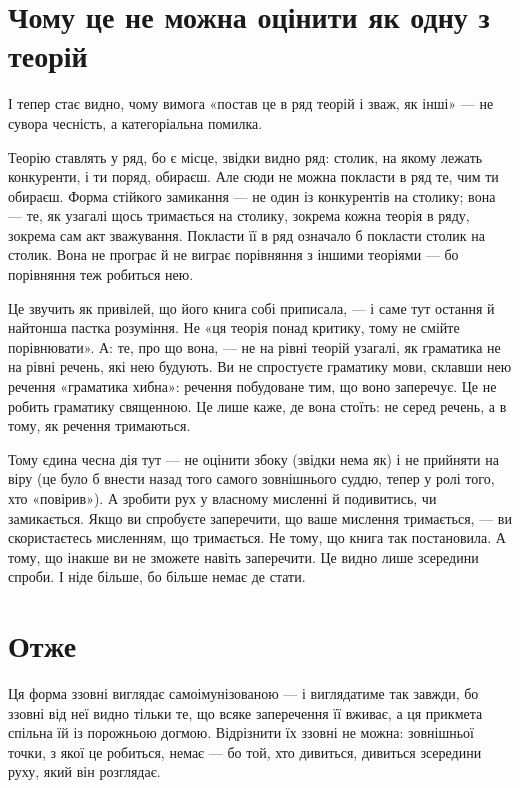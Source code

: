 \documentclass[12pt, a4paper, openany]{book}
\begin{document}
\section{Чому це не можна оцінити як одну з теорій}

І тепер стає видно, чому вимога «постав це в ряд теорій і зваж, як інші» --- не сувора чесність, а категоріальна помилка.

Теорію ставлять у ряд, бо є місце, звідки видно ряд: столик, на якому лежать конкуренти, і ти поряд, обираєш. Але сюди не можна покласти в ряд те, чим ти обираєш. Форма стійкого замикання --- не один із конкурентів на столику; вона --- те, як узагалі щось тримається на столику, зокрема кожна теорія в ряду, зокрема сам акт зважування. Покласти її в ряд означало б покласти столик на столик. Вона не програє й не виграє порівняння з іншими теоріями --- бо порівняння теж робиться нею.

Це звучить як привілей, що його книга собі приписала, --- і саме тут остання й найтонша пастка розуміння. Не «ця теорія понад критику, тому не смійте порівнювати». А: те, про що вона, --- не на рівні теорій узагалі, як граматика не на рівні речень, які нею будують. Ви не спростуєте граматику мови, склавши нею речення «граматика хибна»: речення побудоване тим, що воно заперечує. Це не робить граматику священною. Це лише каже, де вона стоїть: не серед речень, а в тому, як речення тримаються.

Тому єдина чесна дія тут --- не оцінити збоку (звідки нема як) і не прийняти на віру (це було б внести назад того самого зовнішнього суддю, тепер у ролі того, хто «повірив»). А зробити рух у власному мисленні й подивитись, чи замикається. Якщо ви спробуєте заперечити, що ваше мислення тримається, --- ви скористаєтесь мисленням, що тримається. Не тому, що книга так постановила. А тому, що інакше ви не зможете навіть заперечити. Це видно лише зсередини спроби. І ніде більше, бо більше немає де стати.

\section{Отже}

Ця форма ззовні виглядає самоімунізованою --- і виглядатиме так завжди, бо ззовні від неї видно тільки те, що всяке заперечення її вживає, а ця прикмета спільна їй із порожньою догмою. Відрізнити їх ззовні не можна: зовнішньої точки, з якої це робиться, немає --- бо той, хто дивиться, дивиться зсередини руху, який він розглядає.
\end{document}
